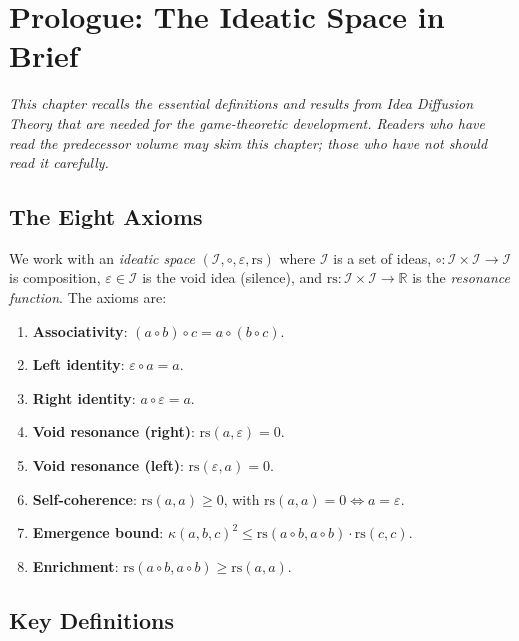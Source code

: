 \documentclass[11pt,oneside]{book}
\theoremstyle{plain}
\theoremstyle{definition}
\theoremstyle{remark}
\newcommand{\rs}{\mathrm{rs}}
\newcommand{\emerge}{\kappa}
\newcommand{\compose}{\circ}
\newcommand{\void}{\varepsilon}
\newcommand{\IS}{\mathcal{I}}
\newcommand{\R}{\mathbb{R}}
\begin{document}
\mainmatter


\chapter*{Prologue: The Ideatic Space in Brief}

\textit{This chapter recalls the essential definitions and results from
\emph{Idea Diffusion Theory} that are needed for the game-theoretic
development. Readers who have read the predecessor volume may skim this
chapter; those who have not should read it carefully.}

\section*{The Eight Axioms}

We work with an \emph{ideatic space} $(\IS, \compose, \void, \rs)$ where
$\IS$ is a set of ideas, $\compose : \IS \times \IS \to \IS$ is composition,
$\void \in \IS$ is the void idea (silence), and $\rs : \IS \times \IS \to \R$
is the \emph{resonance function}. The axioms are:

\begin{enumerate}
\item \textbf{Associativity}: $(a \compose b) \compose c = a \compose (b \compose c)$.
\item \textbf{Left identity}: $\void \compose a = a$.
\item \textbf{Right identity}: $a \compose \void = a$.
\item \textbf{Void resonance (right)}: $\rs(a, \void) = 0$.
\item \textbf{Void resonance (left)}: $\rs(\void, a) = 0$.
\item \textbf{Self-coherence}: $\rs(a, a) \geq 0$, with $\rs(a,a) = 0 \iff a = \void$.
\item \textbf{Emergence bound}: $\emerge(a,b,c)^2 \leq \rs(a \compose b, a \compose b) \cdot \rs(c,c)$.
\item \textbf{Enrichment}: $\rs(a \compose b, a \compose b) \geq \rs(a, a)$.
\end{enumerate}

\section*{Key Definitions}
\end{document}
